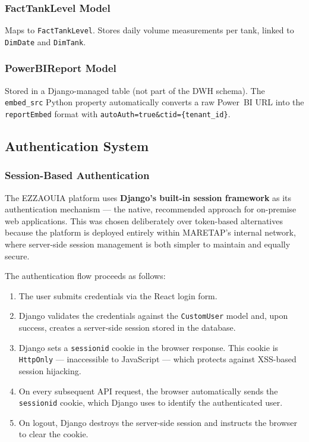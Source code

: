 \begin{sloppypar}
\subsubsection{FactTankLevel Model}

Maps to \texttt{FactTankLevel}. Stores daily volume measurements per tank,
linked to \texttt{DimDate} and \texttt{DimTank}.

\subsubsection{PowerBIReport Model}

Stored in a Django-managed table (not part of the DWH schema). The
\texttt{embed\_src} Python property automatically converts a raw Power~BI URL
into the \texttt{reportEmbed} format with
\texttt{autoAuth=true\&ctid=\{tenant\_id\}}.

\subsection{Authentication System}

\subsubsection{Session-Based Authentication}

The EZZAOUIA platform uses \textbf{Django's built-in session framework} as its
authentication mechanism --- the native, recommended approach for on-premise web
applications. This was chosen deliberately over token-based alternatives because
the platform is deployed entirely within MARETAP's internal network, where
server-side session management is both simpler to maintain and equally secure.

The authentication flow proceeds as follows:

\begin{enumerate}
  \item The user submits credentials via the React login form.
  \item Django validates the credentials against the \texttt{CustomUser} model
    and, upon success, creates a server-side session stored in the database.
  \item Django sets a \texttt{sessionid} cookie in the browser response. This
    cookie is \texttt{HttpOnly} --- inaccessible to JavaScript --- which
    protects against XSS-based session hijacking.
  \item On every subsequent API request, the browser automatically sends the
    \texttt{sessionid} cookie, which Django uses to identify the authenticated
    user.
  \item On logout, Django destroys the server-side session and instructs the
    browser to clear the cookie.
\end{enumerate}


\end{sloppypar}
